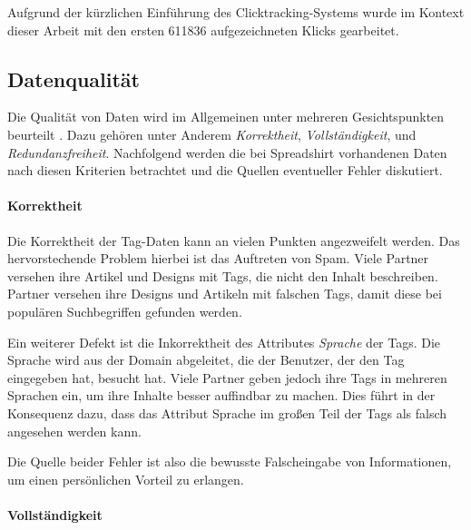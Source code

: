 Aufgrund der kürzlichen Einführung des Clicktracking-Systems wurde im Kontext dieser Arbeit mit den ersten \num{611836} aufgezeichneten Klicks gearbeitet.

\subsection{Datenqualität}

Die Qualität von Daten wird im Allgemeinen unter mehreren Gesichtspunkten beurteilt \cite{hkp2012}. Dazu gehören unter Anderem \emph{Korrektheit}, \emph{Vollständigkeit}, und \emph{Redundanzfreiheit}. Nachfolgend werden die bei Spreadshirt vorhandenen Daten nach diesen Kriterien betrachtet und die Quellen eventueller Fehler \cite[43 ff]{jo2003} diskutiert.

\paragraph{Korrektheit}

Die Korrektheit der Tag-Daten kann an vielen Punkten angezweifelt werden. Das hervorstechende Problem hierbei ist das Auftreten von Spam. Viele Partner versehen ihre Artikel und Designs mit Tags, die nicht den Inhalt beschreiben. Partner versehen ihre Designs und Artikeln mit falschen Tags, damit diese bei populären Suchbegriffen gefunden werden.

Ein weiterer Defekt ist die Inkorrektheit des Attributes \emph{Sprache} der Tags. Die Sprache wird aus der Domain abgeleitet, die der Benutzer, der den Tag eingegeben hat, besucht hat. Viele Partner geben jedoch ihre Tags in mehreren Sprachen ein, um ihre Inhalte besser auffindbar zu machen. Dies führt in der Konsequenz dazu, dass das Attribut Sprache im großen Teil der Tags als falsch angesehen werden kann.

Die Quelle beider Fehler ist also die bewusste Falscheingabe von Informationen, um einen persönlichen Vorteil zu erlangen.
                                                                                                                                                                                                                                                                                                                                                                                                              
\paragraph{Vollständigkeit}

